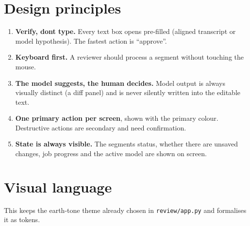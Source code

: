 \documentclass[11pt]{article}
\begin{document}
{\small\setlength{\parskip}{0pt}\setcounter{tocdepth}{1}\tableofcontents}
\bigskip
\hypertarget{design-principles}{%
\section{Design principles}\label{design-principles}}

\begin{enumerate}
\def\labelenumi{\arabic{enumi}.}
\tightlist
\item
  \textbf{Verify, don\textquotesingle t type.} Every text box opens pre-filled (aligned transcript or model hypothesis). The fastest action is ``approve''.
\item
  \textbf{Keyboard first.} A reviewer should process a segment without touching the mouse.
\item
  \textbf{The model suggests, the human decides.} Model output is always visually distinct (a diff panel) and is never silently written into the editable text.
\item
  \textbf{One primary action per screen}, shown with the primary colour. Destructive actions are secondary and need confirmation.
\item
  \textbf{State is always visible.} The segment\textquotesingle s status, whether there are unsaved changes, job progress and the active model are shown on screen.
\end{enumerate}

\hypertarget{visual-language}{%
\section{Visual language}\label{visual-language}}

This keeps the earth-tone theme already chosen in \texttt{review/\allowbreak{}app.\allowbreak{}py} and formalises it as tokens.
\end{document}

